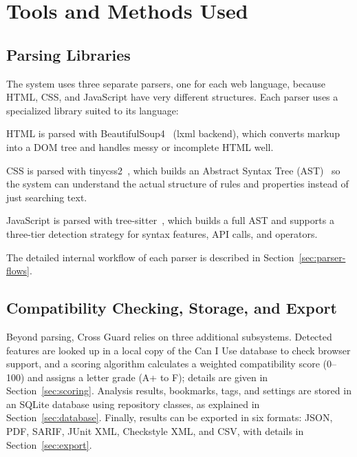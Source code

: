 \section{Tools and Methods Used}
\label{sec:tools-methods}

\subsection{Parsing Libraries}

The system uses three separate parsers, one for each web language, because HTML, CSS, and JavaScript have very different structures. Each parser uses a specialized library suited to its language:

\begin{compactitem}
    \item HTML is parsed with BeautifulSoup4~\cite{bs4docs} (lxml backend), which converts markup into a DOM tree and handles messy or incomplete HTML well.
    \item CSS is parsed with tinycss2~\cite{tinycss2}, which builds an Abstract Syntax Tree (AST)~\cite{aho2006compilers} so the system can understand the actual structure of rules and properties instead of just searching text.
    \item JavaScript is parsed with tree-sitter~\cite{treesitter}, which builds a full AST and supports a three-tier detection strategy for syntax features, API calls, and operators.
\end{compactitem}

The detailed internal workflow of each parser is described in Section~\ref{sec:parser-flows}.

\subsection{Compatibility Checking, Storage, and Export}

Beyond parsing, Cross Guard relies on three additional subsystems. Detected features are looked up in a local copy of the Can I Use database to check browser support, and a scoring algorithm calculates a weighted compatibility score (0--100) and assigns a letter grade (A+ to F); details are given in Section~\ref{sec:scoring}. Analysis results, bookmarks, tags, and settings are stored in an SQLite database using repository classes, as explained in Section~\ref{sec:database}. Finally, results can be exported in six formats: JSON, PDF, SARIF, JUnit XML, Checkstyle XML, and CSV, with details in Section~\ref{sec:export}.

